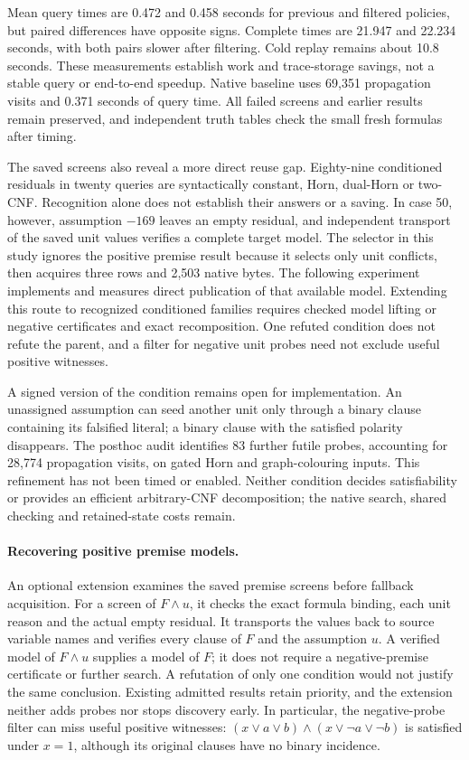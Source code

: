 \documentclass[11pt,a4paper]{article}
\numberwithin{equation}{section}
\theoremstyle{plain}
\theoremstyle{definition}
\theoremstyle{remark}
\begin{document}
Mean query times are 0.472 and 0.458 seconds for previous and filtered policies,
but paired differences have opposite signs. Complete times are 21.947 and
22.234 seconds, with both pairs slower after filtering. Cold replay remains
about 10.8 seconds. These measurements establish work and trace-storage savings,
not a stable query or end-to-end speedup. Native baseline uses 69,351 propagation
visits and 0.371 seconds of query time. All failed screens and earlier results
remain preserved, and independent truth tables check the small fresh formulas
after timing.

The saved screens also reveal a more direct reuse gap. Eighty-nine conditioned
residuals in twenty queries are syntactically constant, Horn, dual-Horn or
two-CNF. Recognition alone does not establish their answers or a saving. In case
50, however, assumption $-169$ leaves an empty residual, and independent
transport of the saved unit values verifies a complete target model. The selector in this study
ignores the positive premise result because it selects only unit conflicts,
then acquires three rows and 2,503 native bytes. The following experiment
implements and measures direct publication of that available model. Extending this route to
recognized conditioned families requires checked model lifting or negative
certificates and exact recomposition. One refuted condition does not refute the
parent, and a filter for negative unit probes need not exclude useful positive
witnesses.

A signed version of the condition remains open for implementation. An unassigned
assumption can seed another unit only through a binary clause containing its
falsified literal; a binary clause with the satisfied polarity disappears.
The posthoc audit identifies 83 further futile probes, accounting for 28,774
propagation visits, on gated Horn and graph-colouring inputs. This refinement
has not been timed or enabled. Neither condition decides satisfiability or
provides an efficient arbitrary-CNF decomposition; the native search, shared
checking and retained-state costs remain.

\paragraph{Recovering positive premise models.}
An optional extension examines the saved premise screens before fallback
acquisition. For a screen of $F\land u$, it checks the exact formula binding,
each unit reason and the actual empty residual. It transports the values back
to source variable names and verifies every clause of $F$ and the assumption
$u$. A verified model of $F\land u$ supplies a model of $F$; it does not require
a negative-premise certificate or further search. A refutation of only one
condition would not justify the same conclusion. Existing admitted results
retain priority, and the extension neither adds probes nor stops discovery
early. In particular, the negative-probe filter can miss useful positive
witnesses: $(x\lor a\lor b)\land(x\lor\neg a\lor\neg b)$ is satisfied under
$x=1$, although its original clauses have no binary incidence.
\end{document}
